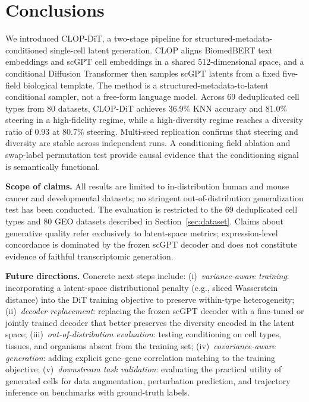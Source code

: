 \documentclass[preprint,12pt]{elsarticle}
\begin{document}
\section{Conclusions}\label{sec:conclusions}

We introduced CLOP-DiT, a two-stage pipeline for structured-metadata-conditioned single-cell latent generation. CLOP aligns BiomedBERT text embeddings and scGPT cell embeddings in a shared 512-dimensional space, and a conditional Diffusion Transformer then samples scGPT latents from a fixed five-field biological template. The method is a structured-metadata-to-latent conditional sampler, not a free-form language model. Across 69 deduplicated cell types from 80 datasets, CLOP-DiT achieves 36.9\% KNN accuracy and 81.0\% steering in a high-fidelity regime, while a high-diversity regime reaches a diversity ratio of 0.93 at 80.7\% steering. Multi-seed replication confirms that steering and diversity are stable across independent runs. A conditioning field ablation and swap-label permutation test provide causal evidence that the conditioning signal is semantically functional.

\textbf{Scope of claims.} All results are limited to in-distribution human and mouse cancer and developmental datasets; no stringent out-of-distribution generalization test has been conducted. The evaluation is restricted to the 69 deduplicated cell types and 80 GEO datasets described in Section~\ref{sec:dataset}. Claims about generative quality refer exclusively to latent-space metrics; expression-level concordance is dominated by the frozen scGPT decoder and does not constitute evidence of faithful transcriptomic generation.

\textbf{Future directions.} Concrete next steps include: (i)~\emph{variance-aware training}: incorporating a latent-space distributional penalty (e.g., sliced Wasserstein distance) into the DiT training objective to preserve within-type heterogeneity; (ii)~\emph{decoder replacement}: replacing the frozen scGPT decoder with a fine-tuned or jointly trained decoder that better preserves the diversity encoded in the latent space; (iii)~\emph{out-of-distribution evaluation}: testing conditioning on cell types, tissues, and organisms absent from the training set; (iv)~\emph{covariance-aware generation}: adding explicit gene--gene correlation matching to the training objective; (v)~\emph{downstream task validation}: evaluating the practical utility of generated cells for data augmentation, perturbation prediction, and trajectory inference on benchmarks with ground-truth labels.
\end{document}
